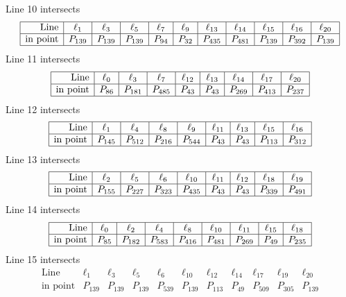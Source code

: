 \documentclass{article}
\begin{document}
{$$$$
Line 10 intersects 
$$
\begin{array}{|r*{10}{|c}|}
\hline
\mbox{Line}  & \ell_{1} & \ell_{3} & \ell_{5} & \ell_{7} & \ell_{9} & \ell_{13} & \ell_{14} & \ell_{15} & \ell_{16} & \ell_{20}\\
\hline
\mbox{in point}  & P_{139} & P_{139} & P_{139} & P_{94} & P_{32} & P_{435} & P_{481} & P_{139} & P_{392} & P_{139}\\
\hline
\end{array}
$$
Line 11 intersects 
$$
\begin{array}{|r*{8}{|c}|}
\hline
\mbox{Line}  & \ell_{0} & \ell_{3} & \ell_{7} & \ell_{12} & \ell_{13} & \ell_{14} & \ell_{17} & \ell_{20}\\
\hline
\mbox{in point}  & P_{86} & P_{181} & P_{485} & P_{43} & P_{43} & P_{269} & P_{413} & P_{237}\\
\hline
\end{array}
$$
Line 12 intersects 
$$
\begin{array}{|r*{8}{|c}|}
\hline
\mbox{Line}  & \ell_{1} & \ell_{4} & \ell_{8} & \ell_{9} & \ell_{11} & \ell_{13} & \ell_{15} & \ell_{16}\\
\hline
\mbox{in point}  & P_{145} & P_{512} & P_{216} & P_{544} & P_{43} & P_{43} & P_{113} & P_{312}\\
\hline
\end{array}
$$
Line 13 intersects 
$$
\begin{array}{|r*{8}{|c}|}
\hline
\mbox{Line}  & \ell_{2} & \ell_{5} & \ell_{6} & \ell_{10} & \ell_{11} & \ell_{12} & \ell_{18} & \ell_{19}\\
\hline
\mbox{in point}  & P_{155} & P_{227} & P_{323} & P_{435} & P_{43} & P_{43} & P_{339} & P_{491}\\
\hline
\end{array}
$$
Line 14 intersects 
$$
\begin{array}{|r*{8}{|c}|}
\hline
\mbox{Line}  & \ell_{0} & \ell_{2} & \ell_{4} & \ell_{8} & \ell_{10} & \ell_{11} & \ell_{15} & \ell_{18}\\
\hline
\mbox{in point}  & P_{85} & P_{182} & P_{583} & P_{416} & P_{481} & P_{269} & P_{49} & P_{235}\\
\hline
\end{array}
$$
Line 15 intersects 
$$
\begin{array}{|r*{10}{|c}|}
\hline
\mbox{Line}  & \ell_{1} & \ell_{3} & \ell_{5} & \ell_{6} & \ell_{10} & \ell_{12} & \ell_{14} & \ell_{17} & \ell_{19} & \ell_{20}\\
\hline
\mbox{in point}  & P_{139} & P_{139} & P_{139} & P_{539} & P_{139} & P_{113} & P_{49} & P_{509} & P_{305} & P_{139}\\

\end{array}$$}
\end{document}
